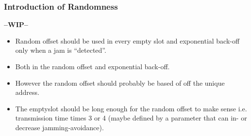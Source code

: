 \subsubsection{Introduction of Randomness} %
\label{ssub:introduction_of_randomness}
\textbf{--WIP--}
\begin{itemize}
    \item Random offset should be used in every empty slot and exponential back-off only when a jam is ``detected''.
    \item Both in the random offset and exponential back-off.
    \item However the random offset should probably be based of off the unique address.
    \item The emptyslot should be long enough for the random offset to make sense i.e. transmission time times 3 or 4 (maybe defined by a parameter that can in- or decrease jamming-avoidance).
\end{itemize}



